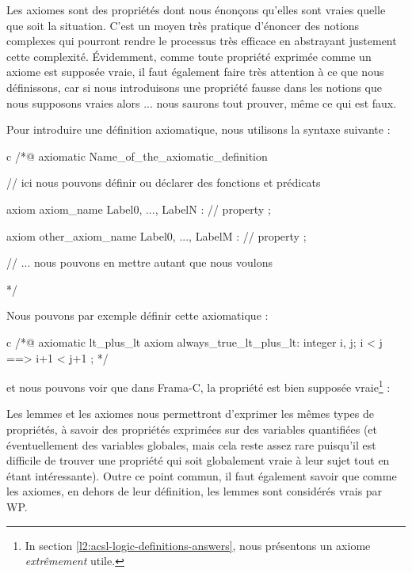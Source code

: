 
Les axiomes sont des propriétés dont nous énonçons qu'elles sont vraies quelle
que soit la situation. C'est un moyen très pratique d'énoncer des notions
complexes qui pourront rendre le processus très efficace en abstrayant
justement cette complexité. Évidemment, comme toute propriété exprimée comme un
axiome est supposée vraie, il faut également faire très attention à ce que nous
définissons, car si nous introduisons une propriété fausse dans les notions que
nous supposons vraies alors ... nous saurons tout prouver, même ce qui est faux.





Pour introduire une définition axiomatique, nous utilisons la syntaxe suivante :



\begin{CodeBlock}{c}
/*@
  axiomatic Name_of_the_axiomatic_definition {
    // ici nous pouvons définir ou déclarer des fonctions et prédicats

    axiom axiom_name { Label0, ..., LabelN }:
      // property ;

    axiom other_axiom_name { Label0, ..., LabelM }:
      // property ;

    // ... nous pouvons en mettre autant que nous voulons
  }
*/
\end{CodeBlock}



Nous pouvons par exemple définir cette axiomatique :



\begin{CodeBlock}{c}
/*@
  axiomatic lt_plus_lt{
    axiom always_true_lt_plus_lt:
      \forall integer i, j; i < j ==> i+1 < j+1 ;
  }
*/
\end{CodeBlock}



et nous pouvons voir que dans Frama-C, la propriété est bien supposée
vraie\footnote{In section \ref{l2:acsl-logic-definitions-answers}, nous
présentons un axiome {\em extrêmement} utile.} :






Les lemmes et les axiomes nous permettront d'exprimer les mêmes types de
propriétés, à savoir des propriétés exprimées sur des variables quantifiées (et
éventuellement des variables globales, mais cela reste assez rare puisqu'il est
difficile de trouver une propriété qui soit globalement vraie à leur sujet tout
en étant intéressante). Outre ce point commun, il faut également savoir que
comme les axiomes, en dehors de leur définition, les lemmes sont considérés
vrais par WP.



